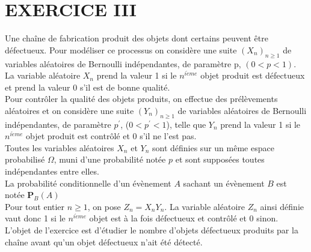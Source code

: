 \documentclass[11pt]{article}%
\begin{document}
\section*{EXERCICE III}

Une chaîne de fabrication produit des objets dont certains peuvent être
défectueux. Pour modéliser ce processus on considère une suite $\left(
X_{n}\right)_{n\geq 1}$ de variables aléatoires de Bernoulli
indépendantes, de paramètre p, $(0<p<1)$. La variable aléatoire $X_{n}$
prend la
valeur 1 si le $n^{i\grave{e}me}$ objet produit est défectueux et prend
la
valeur 0 s'il est de bonne qualité.\\
Pour contrôler la qualité des objets produits, on effectue des
prélèvements
aléatoires et on considère une suite $\left( Y_{n}\right)_{n\geq 1}$
de variables aléatoires de Bernoulli indépendantes, de paramètre
$p^{\prime }
$, ($0<p^{\prime }<1$), telle que $Y_{n}$ prend la valeur 1 si le
$n^{i\grave{e}me}$ objet produit est contrôlé et 0 s'il ne l'est pas.\\
Toutes les variables aléatoires $X_{n}$ et $Y_{n}$ sont définies sur un
même
espace probabilisé $\Omega $, muni d'une probabilité notée $p$ et sont
supposées toutes indépendantes entre elles.\\
La probabilité conditionnelle d'un évènement $A$ sachant un évènement
$B$
est notée $\mathbf{P}_{B}\left( A\right) $\\
Pour tout entier $n\geq 1$, on pose $Z_{n} = X_{n}Y_{n}$. La variable
aléatoire $Z_{n}$ ainsi définie vaut donc 1 si le $n^{i\grave{e}me}$
objet est à
la fois défectueux et contrôlé et 0 sinon.\\
L'objet de l'exercice est d'étudier le nombre d'objets défectueux
produits
par la chaîne avant qu'un objet défectueux n'ait été détecté.
\end{document}
